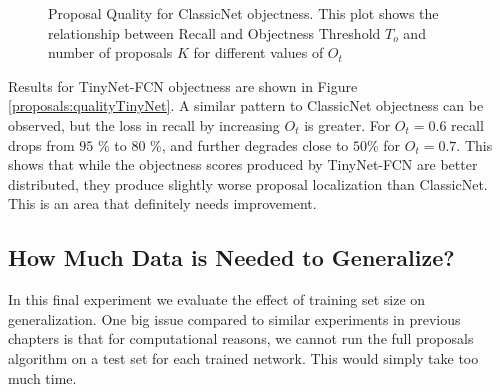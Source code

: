 \begin{figure}[t]
{
	}
	\vspace*{0.5cm}
	\caption[Proposal Quality for ClassicNet objectness]{Proposal Quality for ClassicNet objectness. This plot shows the relationship between Recall and Objectness Threshold $T_o$ and number of proposals $K$ for different values of $O_t$}
	\label{proposals:qualityClassicNet}
\end{figure}

Results for TinyNet-FCN objectness are shown in Figure \ref{proposals:qualityTinyNet}. A similar pattern to ClassicNet objectness can be observed, but the loss in recall by increasing $O_t$ is greater. For $O_t = 0.6$ recall drops from $95$ \% to $80$ \%, and further degrades close to $50 \%$ for $O_t = 0.7$. This shows that while the objectness scores produced by TinyNet-FCN are better distributed, they produce slightly worse proposal localization than ClassicNet. This is an area that definitely needs improvement.

\subsection{How Much Data is Needed to Generalize?}

In this final experiment we evaluate the effect of training set size on generalization. One big issue compared to similar experiments in previous chapters is that for computational reasons, we cannot run the full proposals algorithm on a test set for each trained network. This would simply take too much time.

